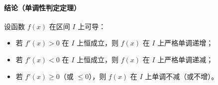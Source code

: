 \begin{statementbox}
\paragraph{结论（单调性判定定理）}

设函数 $f(x)$ 在区间 $I$ 上可导：
\begin{itemize}
  \item 若 $f'(x) > 0$ 在 $I$ 上恒成立，则 $f(x)$ 在 $I$ 上严格单调递增；
  \item 若 $f'(x) < 0$ 在 $I$ 上恒成立，则 $f(x)$ 在 $I$ 上严格单调递减；
  \item 若 $f'(x) \ge 0$（或 $\le 0$），则 $f(x)$ 在 $I$ 上单调不减（或不增）。
\end{itemize}
\end{statementbox}
